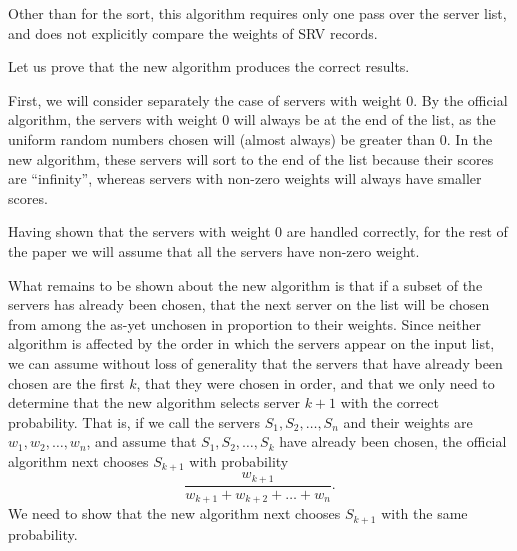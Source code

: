 Other than for the sort, this algorithm requires only  one pass over
the server list, and does not explicitly compare the weights of SRV
records.

Let us prove that the new algorithm produces the correct results.

First, we will consider separately the case of servers with weight 0.
By the official algorithm, the servers with weight 0 will always be at
the end of the list, as the uniform random numbers chosen will (almost
always) be greater than 0.  In the new algorithm, these servers will
sort to the end of the list because their scores are ``infinity'',
whereas servers
with non-zero weights will always have smaller scores.

Having shown that the servers with weight 0 are handled correctly, for
the rest of the paper we will assume that all the servers have
non-zero weight.

What remains to be shown about the new algorithm is that if a subset
of the servers has already been chosen, that the next server on the
list will be chosen from among the as-yet unchosen in proportion to their
weights.
Since neither algorithm is affected by the order in which the servers
appear on the input list, we can assume without loss of generality
that the servers that have already been chosen are the first $k$,
that they were chosen in order, and that we only need to determine
that the new algorithm selects server $k+1$ with the correct probability.
That is, if we call the servers 
$S_1, S_2, \ldots, S_n$ and their weights are $w_1, w_2, \ldots, w_n$,
and assume that $S_1, S_2, \ldots, S_k$ have already been chosen, the
official algorithm next chooses $S_{k+1}$ with probability 
\begin{equation}
\frac{w_{k+1}}{w_{k+1} + w_{k+2} + \ldots + w_n}. \label{rfc}
\end{equation}
We need to show that the new algorithm next chooses $S_{k+1}$ with the
same probability.

